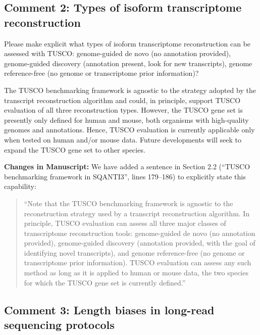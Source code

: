 \documentclass[11pt]{article}
\begin{document}
\subsection{Comment 2: Types of isoform transcriptome reconstruction}

\begin{reviewercomment}
Please make explicit what types of isoform transcriptome reconstruction can be assessed with TUSCO: genome-guided de novo (no annotation provided), genome-guided discovery (annotation present, look for new transcripts), genome reference-free (no genome or transcriptome prior information)?
\end{reviewercomment}

\begin{responseboxnew}
The TUSCO benchmarking framework is agnostic to the strategy adopted by the transcript reconstruction algorithm and could, in principle, support TUSCO evaluation of all three reconstruction types. However, the TUSCO gene set is presently only defined for human and mouse, both organisms with high-quality genomes and annotations. Hence, TUSCO evaluation is currently applicable only when tested on human and/or mouse data. Future developments will seek to expand the TUSCO gene set to other species.

\vspace{0.3cm}
\textbf{Changes in Manuscript:} We have added a sentence in Section 2.2 (``TUSCO benchmarking framework in SQANTI3'', lines 179--186) to explicitly state this capability:
\begin{quote}
``Note that the TUSCO benchmarking framework is agnostic to the reconstruction strategy used by a transcript reconstruction algorithm. In principle, TUSCO evaluation can assess all three major classes of transcriptome reconstruction tools: genome-guided de novo (no annotation provided), genome-guided discovery (annotation provided, with the goal of identifying novel transcripts), and genome reference-free (no genome or transcriptome prior information). TUSCO evaluation can assess any such method as long as it is applied to human or mouse data, the two species for which the TUSCO gene set is currently defined.''
\end{quote}
\end{responseboxnew}

\subsection{Comment 3: Length biases in long-read sequencing protocols}
\end{document}
